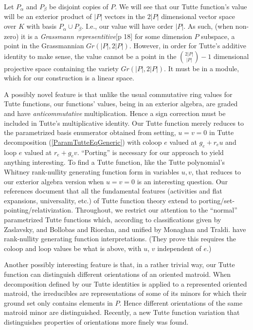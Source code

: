 \documentclass[Unicode]{cedram-alco}
\begin{document}
Let $P_{\alpha}$ and $P_{\beta}$ be disjoint copies of $P$. 
We will see that our Tutte function's value will be an exterior product of
$|P|$ vectors in the $2|P|$ dimensional vector space over $K$ with
basis $P_\alpha \cup P_\beta$.
I.e., our value will
have order  $|P|$.
As such, (when non-zero)
it is a \emph{Grassmann representitive}\cite{MarcusFDMuAlPt2}[p 18]
for some
dimension $P$ subspace, a point in the Grassmannian $Gr(|P|,2|P|)$.
However, in order for Tutte's additive identity to make sense, the value cannot be
a point in the $\binom{2|P|}{|P|}-1$ dimensional projective space
containing the variety $Gr(|P|,2|P|)$.  It must be in a module, which for
our construction is a linear space.

A possibly novel feature is that unlike the usual commutative ring values for Tutte
functions, our functions' values, being in an exterior algebra, are graded and have
\emph{anticommutative} multiplication.
Hence a sign correction must be included in Tutte's multiplicative
identity.  Our Tutte function merely reduces to the parametrized
basis enumerator obtained from setting, $u=v=0$ in Tutte
decomposition (\ref{ParamTutteEqGeneric})
with coloop $e$ valued at $g_e+r_eu$ and loop $e$ valued at $r_e+g_ev$.
``Porting'' is necessary for our approach to yield anything
interesting. To find a Tutte function,
like the Tutte polynomial's Whitney rank-nullity
generating function form in variables $u,v$, that reduces to our exterior
algebra version when $u=v=0$ is an interesting question.
Our
references\cite{MR0419272,SetPointedLV,sdcPorted,TutteEx,RelTuttePolyDiaoHetyei}
document that all the fundamental features
(activities and flat expansions, universality, etc.)
of Tutte function theory extend to porting/set-pointing/relativization.  Throughout,
we restrict our attention to the ``normal'' parametrized Tutte functions which, according
to classifications given by Zaslavsky\cite{MR93a:05047},
and Bollobas and Riordan\cite{BollobasRiordanTuttePolyColored}, and
unified by Monaghan and Traldi\cite{Ellis-Monaghan-Traldi}.
have rank-nullity generating function interpretations.
(They prove this requires the
coloop and loop values be what is above, with $u$, $v$ independent of $e$.)

Another possibly interesting feature is that, in a rather trivial way,
our Tutte function can distinguish different orientations of an oriented
matroid.  When decomposition defined by our Tutte identities is applied to
a represented oriented matroid, the irreducibles are representations of
some of its minors for which their ground set only contains elements in $P$.
Hence different orientations of the same matroid minor are distinguished.  Recently,
a new Tutte function variation that distinguishes properties of orientations
more finely was found\cite{AwanBernardiOMTuttePre}.
\end{document}
